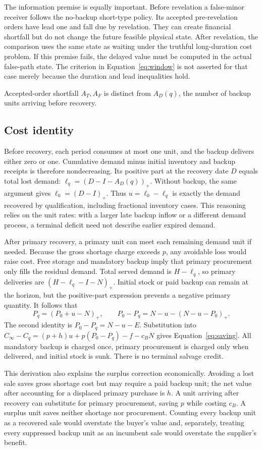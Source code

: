 \documentclass[preprint,11pt,authoryear]{elsarticle}
\begin{document}
The information premise is equally important. Before revelation a false-minor receiver follows the no-backup short-type policy. Its accepted pre-revelation orders have lead one and fall due by revelation. They can create financial shortfall but do not change the future feasible physical state. After revelation, the comparison uses the same state as waiting under the truthful long-duration cost problem. If this premise fails, the delayed value must be computed in the actual false-path state. The criterion in Equation~\eqref{eq:window} is not asserted for that case merely because the duration and lead inequalities hold.

Accepted-order shortfall $A_T,A_F$ is distinct from $A_D(q)$, the number of backup units arriving before recovery.

\subsection{Cost identity}
Before recovery, each period consumes at most one unit, and the backup delivers either zero or one. Cumulative demand minus initial inventory and backup receipts is therefore nondecreasing. Its positive part at the recovery date $D$ equals total lost demand: $\ell_q=(D-I-A_D(q))_+$. Without backup, the same argument gives $\ell_0=(D-I)_+$. Thus $u=\ell_0-\ell_q$ is exactly the demand recovered by qualification, including fractional inventory cases. This reasoning relies on the unit rates: with a larger late backup inflow or a different demand process, a terminal deficit need not describe earlier expired demand.

After primary recovery, a primary unit can meet each remaining demand unit if needed. Because the gross shortage charge exceeds $p$, any avoidable loss would raise cost. Free storage and mandatory backup imply that primary procurement only fills the residual demand. Total served demand is $H-\ell_q$, so primary deliveries are $(H-\ell_q-I-N)_+$. Initial stock or paid backup can remain at the horizon, but the positive-part expression prevents a negative primary quantity. It follows that
\[
 P_q=(P_0+u-N)_+,\qquad
 P_0-P_q=N-u-(N-u-P_0)_+.
\]
The second identity is $P_0-P_q=N-u-E$. Substitution into $C_\infty-C_q=(p+h)u+p(P_0-P_q)-f-c_BN$ gives Equation~\eqref{eq:saving}. All mandatory backup is charged once, primary procurement is charged only when delivered, and initial stock is sunk. There is no terminal salvage credit.

This derivation also explains the surplus correction economically. Avoiding a lost sale saves gross shortage cost but may require a paid backup unit; the net value after accounting for a displaced primary purchase is $h$. A unit arriving after recovery can substitute for primary procurement, saving $p$ while costing $c_B$. A surplus unit saves neither shortage nor procurement. Counting every backup unit as a recovered sale would overstate the buyer's value and, separately, treating every suppressed backup unit as an incumbent sale would overstate the supplier's benefit.
\end{document}
